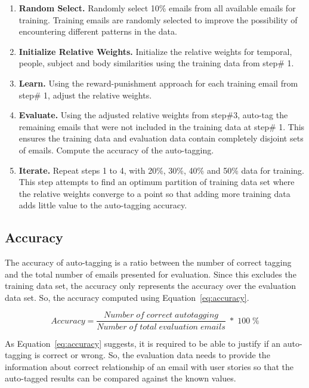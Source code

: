 \begin{enumerate}
	\item \textbf{Random Select.} Randomly select 10\% emails from all available emails for training. Training emails are randomly selected to improve the possibility of encountering different patterns in the data.
	\item \textbf{Initialize Relative Weights.} Initialize the relative weights for temporal, people, subject and body similarities using the training data from step\# 1.
	\item \textbf{Learn.} Using the reward-punishment approach for each training email from step\# 1, adjust the relative weights.
	\item \textbf{Evaluate.} Using the adjusted relative weights from step\#3, auto-tag the remaining emails that were not included in the training data at step\# 1. This ensures the training data and evaluation data contain completely disjoint sets of emails. Compute the accuracy of the auto-tagging.
	\item \textbf{Iterate.} Repeat steps 1 to 4, with 20\%, 30\%, 40\% and 50\% data for training. This step attempts to find an optimum partition of  training data set where the relative weights converge to a point so that adding more training data adds little value to the auto-tagging accuracy.
	
\end{enumerate}

\subsection{Accuracy}
The accuracy of auto-tagging is a ratio between the number of correct tagging and the total number of emails presented for evaluation. Since this excludes the training data set, the accuracy only represents the accuracy over the evaluation data set. So, the accuracy computed using Equation~\ref{eq:accuracy}.
	
\begin{equation}
\label{eq:accuracy}
Accuracy = \frac{Number \;  of  \; correct  \; auto tagging} {Number \;  of \;  total \;  evaluation \;  emails }  \; *  \; 100  \; \%
\end{equation}
	
As Equation~\ref{eq:accuracy} suggests, it is required to be able to justify if an auto-tagging is correct or wrong. So, the evaluation data needs to provide the information about correct relationship of an email with user stories so that the auto-tagged results can be compared against the known values.

